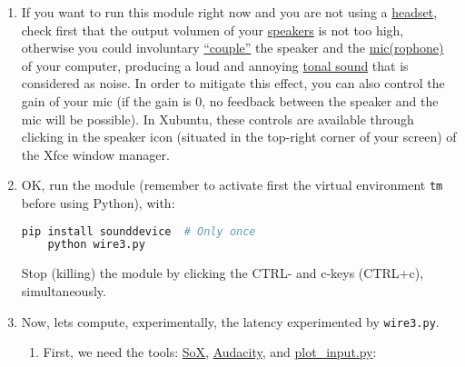 \begin{enumerate}
\item If you want to run this module right now and you are not using a
  \href{https://en.wikipedia.org/wiki/Headset_(audio)}{headset}, check
  first that the output volumen of your
  \href{https://en.wikipedia.org/wiki/Headset_(audio)}{speakers} is
  not too high, otherwise you could involuntary
  \href{https://www.youtube.com/watch?v=rI90lhYAffo}{``couple''} the
  speaker and the
  \href{https://en.wikipedia.org/wiki/Microphone}{mic(rophone)} of
  your computer, producing a loud and annoying
  \href{https://www.cirrusresearch.co.uk/blog/2012/03/tonal-noise-analysis-with-the-optimus-green-sound-level-meters/}{tonal
    sound} that is considered as noise. In order to mitigate this
  effect, you can also control the gain of your mic (if the
  gain is 0, no feedback between the speaker and the mic will be
  possible). In Xubuntu, these controls are available through clicking in
  the speaker icon (situated in the top-right corner of your screen)
  of the Xfce window manager.

\item OK, run the module (remember to activate first the virtual environment
  \texttt{tm} before using Python), with:

  \begin{lstlisting}[language=Bash]
    pip install sounddevice  # Only once
    python wire3.py
  \end{lstlisting}

  Stop (killing) the module by clicking the CTRL- and c-keys (CTRL+c),
  simultaneously.


\item Now, lets compute, experimentally, the latency experimented by
  \texttt{wire3.py}.

  \begin{enumerate} \item First, we need the
  tools: \href{http://sox.sourceforge.net/}{SoX}, \href{https://www.audacityteam.org/}{Audacity},
  and \href{https://raw.githubusercontent.com/Tecnologias-multimedia/intercom/master/test/sounddevice/plot_input.py}{plot\_input.py}:
  

\end{enumerate}
\end{enumerate}
